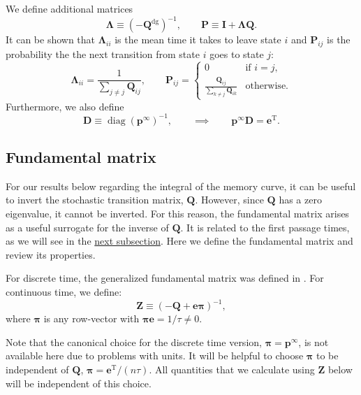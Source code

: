 \documentclass{article} %
\newcommand{\inv}{^{-1}}
\newcommand{\dg}{^\mathrm{dg}}
\newcommand{\trans}{^\mathrm{T}}
\newcommand{\I}{\mathbf{I}}
\newcommand{\onev}{\mathbf{e}}
\newcommand{\MM}{\mathbf{Q}}
\newcommand{\pr}{\mathbf{p}}
\newcommand{\eq}{\pr^\infty}
\newcommand{\fund}{\mathbf{Z}}
\newcommand{\Pb}{\mathbf{P}}
\newcommand{\D}{\mathbf{D}}
\newcommand{\pib}{\boldsymbol{\pi}}
\newcommand{\Lb}{\boldsymbol{\Lambda}}
\begin{document}
We define additional matrices
%
\begin{equation}\label{eq:defDLP}
  \Lb \equiv (-\MM\dg)\inv,
  \qquad
  \Pb \equiv \I + \Lb\MM.
\end{equation}
%
It can be shown that $\Lb_{ii}$ is the mean time it takes to leave state $i$ and $\Pb_{ij}$ is the probability the the next transition from state $i$ goes to state $j$:
%
\begin{equation}\label{eq:LamdaPcmpt}
  \Lb_{ii} = \frac{1}{\sum_{j \neq j} \MM_{ij}},
  \qquad
  \Pb_{ij} = %
  \begin{cases}
     0                                         &\text{if }i=j, \\
     \frac{\MM_{ij}}{\sum_{k \neq j} \MM_{ik}} &\text{otherwise}.
  \end{cases}
\end{equation}
%
Furthermore, we also define
%
\begin{equation}\label{eq:pdotD}
  \D \equiv \operatorname{diag}(\eq)\inv,
  \qquad\implies\qquad
  \eq\D=\onev\trans.
\end{equation}
%

\subsection{Fundamental matrix}\label{sec:fund}

For our results below regarding the integral of the memory curve, it can be useful to invert the stochastic transition matrix, $\MM$.
However, since $\MM$ has a zero eigenvalue, it cannot be inverted.
For this reason, the fundamental matrix arises as a useful surrogate for the inverse of $\MM$.
It is related to the first passage times, as we will see in the \hyperref[sec:fpt]{next subsection}.
Here we define the fundamental matrix and review its properties.

\begin{defn}
  For discrete time, the generalized fundamental matrix was defined in \cite{Kemeny1981const}.
  For continuous time, we define:
  \begin{equation}\label{eq:funddef}
    \fund \equiv (-\MM + \onev\pib)\inv,
  \end{equation}
  where $\pib$ is any row-vector with $\pib\onev=1/\tau\neq0$.
\end{defn}
Note that the canonical choice for the discrete time version, $\pib=\eq$, is not available here due to problems with units.
It will be helpful to choose $\pib$ to be independent of $\MM$, \eg $\pib=\onev\trans/(n\tau)$.
All quantities that we calculate using $\fund$ below will be independent of this choice.
\end{document}
